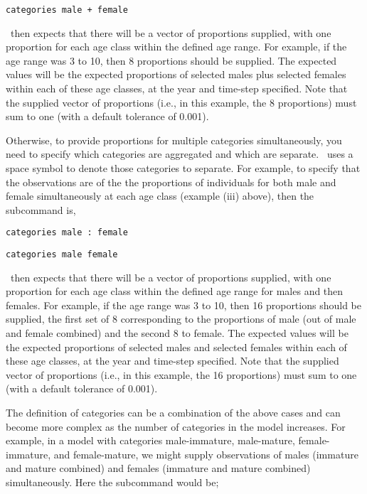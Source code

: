 {\small{\begin{verbatim}
categories male + female
\end{verbatim}}}
\TODOend

\SPM\ then expects that there will be a vector of proportions supplied, with one proportion for each age class within the defined age range. For example, if the age range was 3 to 10, then 8 proportions should be supplied. The expected values will be the expected proportions of selected males plus selected females within each of these age classes, at the year and time-step specified. Note that the supplied vector of proportions (i.e., in this example, the 8 proportions) must sum to one (with a default tolerance of 0.001).

Otherwise, to provide proportions for multiple categories simultaneously, you need to specify which categories are aggregated and which are separate. \SPM\ uses a space symbol to denote those categories to separate. For example, to specify that the observations are of the the proportions of individuals for both male and female simultaneously at each age class (example (iii) above), then the subcommand  is,

\TOUNDO

{\small{\begin{verbatim}
categories male : female
\end{verbatim}}}
\TOUNDOend

\TODO

{\small{\begin{verbatim}
categories male female
\end{verbatim}}}

\TODOend

\SPM\ then expects that there will be a vector of proportions supplied, with one proportion for each age class within the defined age range for males and then females. For example, if the age range was 3 to 10, then 16 proportions should be supplied, the first set of 8 corresponding to the proportions of male (out of male and female combined) and the second 8 to female. The expected values will be the expected proportions of selected males and selected females within each of these age classes, at the year and time-step specified. Note that the supplied vector of proportions (i.e., in this example, the 16 proportions) must sum to one (with a default tolerance of 0.001).

The definition of categories can be a combination of the above cases and can become more complex as the number of categories in the model increases. For example, in a model with categories male-immature, male-mature, female-immature, and female-mature, we might supply observations of males (immature and mature combined) and females (immature and mature combined) simultaneously. Here the  subcommand would be;

